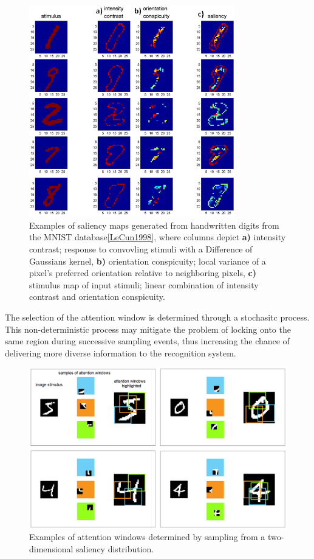 \documentclass{report}
\begin{document}
\begin{figure}[ht]
\centering
\includegraphics[width=0.8\textwidth]{saliency_examples}
\caption{Examples of saliency maps generated from handwritten digits from the MNIST database\cref{LeCun1998}, where columns depict \textbf{a)} intensity contrast; response to convovling stimuli with a Difference of Gaussians kernel, \textbf{b)} orientation conspicuity; local variance of a pixel's preferred orientation relative to neighboring pixels, \textbf{c)} stimulus map of input stimuli; linear combination of intensity contrast and orientation conspicuity.
\label{fig:saliency_examples}}
\end{figure}

The selection of the attention window is determined through a stochasitc process. This non-deterministic process may mitigate the problem of locking onto the same region during successive sampling events, thus increasing the chance of delivering more diverse information to the recognition system. 

\begin{figure}[ht]
\centering
\includegraphics[width=1.0\textwidth]{attention_windows_examples}
\caption{Examples of attention windows determined by sampling from a two-dimensional saliency distribution.
\label{fig:attention_windows_examples}}
\end{figure}
\end{document}
